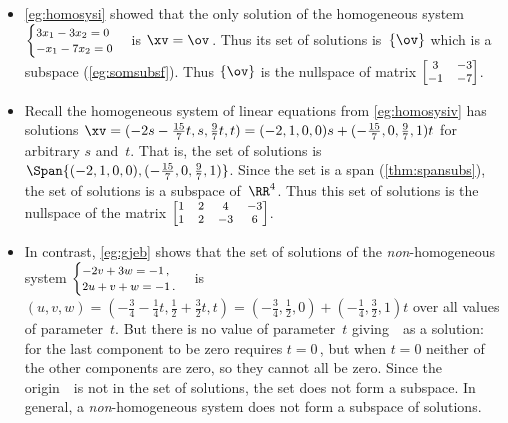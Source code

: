 \begin{example} \label{eg:nullsp}
\begin{itemize}
\item  \autoref{eg:homosysi} showed that the only solution of the homogeneous system \(\footnotesize\begin{cases}
3x_1-3x_2=0\\-x_1-7x_2=0
\end{cases}\) is \(\xv=\ov\)\,.
Thus its set of solutions is~\(\{\ov\}\) which is a subspace (\autoref{eg:somsubsf}).
Thus \(\{\ov\}\) is the nullspace of matrix \(\footnotesize\begin{bmatrix} 3&-3\\-1&-7 \end{bmatrix}\).

\item Recall the homogeneous system of linear equations from \autoref{eg:homosysiv} has solutions \(\xv=(-2s-\frac{15}7t,s,\frac97t,t) =(-2,1,0,0)s+(-\frac{15}7,0,\frac97,1)t\) for arbitrary \(s\) and~\(t\).
That is, the set of solutions is \(\Span\{(-2,1,0,0),(-\frac{15}7,0,\frac97,1)\}\).
Since the set is a span (\autoref{thm:spansubs}), the set of solutions is a subspace of~\(\RR^4\).
Thus this set of solutions is the nullspace of the matrix \(\footnotesize\begin{bmatrix} 1&2&4&-3\\
1&2&-3&6 \end{bmatrix}\).

\item In contrast, \autoref{eg:gjeb} shows that the set of solutions of the \emph{non}-homogeneous system \(\footnotesize\begin{cases}
-2v+3w=-1\,,\\2u+v+w=-1\,.
\end{cases}\)
is \((u,v,w)=(-\frac34-\frac14t,\frac12+\frac32t,t)
=(-\frac34,\frac12,0)+(-\frac14,\frac32,1)t\)
over all values of parameter~\(t\).
But there is no value of parameter~\(t\) giving~\ov\ as a solution: for the last component to be zero requires \(t=0\)\,, but when \(t=0\) neither of the other components are zero, so they cannot all be zero.
Since the origin~\ov\ is not in the set of solutions, the set does not form a subspace. 
In general, a \emph{non}-homogeneous system does not form a subspace of solutions.
\end{itemize}
\end{example}


